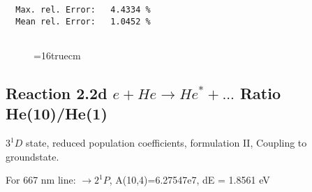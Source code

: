 \documentclass[12pt]{article}
\begin{document}
\begin{small}
\begin{verbatim}
  Max. rel. Error:   4.4334 %
  Mean rel. Error:   1.0452 %


\end{verbatim}\end{small}
\begin{figure} \label{2.2c}
\epsfxsize=16truecm
\end{figure}
\newpage


\subsection{
  Reaction 2.2d $e + He \rightarrow He^* + ... $ Ratio He(10)/He(1)
}

  $3^1D$ state,
  reduced population coefficients, formulation II,
  Coupling to groundstate.

  For 667 nm line: $\rightarrow 2^1P$, A(10,4)=6.27547e7, dE = 1.8561 eV
\end{document}
